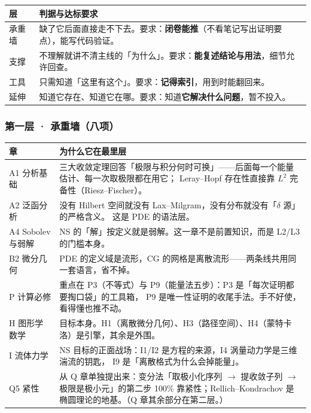 \begin{center}
\begin{tabular}{L{1.7cm}L{12.9cm}}
\toprule
\textbf{层} & \textbf{判据与达标要求} \\
\midrule
承重墙 & 缺了它后面直接走不下去。要求：\textbf{闭卷能推}（不看笔记写出证明要点），能写代码验证。 \\
支撑 & 不理解就讲不清主线的「为什么」。要求：\textbf{能复述结论与用法}，细节允许回查。 \\
工具 & 只需知道「这里有这个」。要求：\textbf{记得索引}，用到时能翻回来。 \\
延伸 & 知道它存在、知道它在哪。要求：知道\textbf{它解决什么问题}，暂不投入。 \\
\bottomrule
\end{tabular}
\end{center}

\subsubsection{第一层 · 承重墙（八项）}

\begin{center}
\begin{tabular}{L{2.5cm}L{12.0cm}}
\toprule
\textbf{章} & \textbf{为什么它在最里层} \\
\midrule
A1 分析基础 & 三大收敛定理回答「极限与积分何时可换」——后面每一个能量估计、每一次取极限都在用它；
Leray--Hopf 存在性直接靠 $L^2$ 完备性（Riesz--Fischer）。 \\
A2 泛函分析 & 没有 Hilbert 空间就没有 Lax--Milgram，没有分布就没有「$\delta$ 源」的严格含义。
这是 PDE 的语法层。 \\
A4 Sobolev 与弱解 & NS 的「解」按定义就是弱解。这一章不是前置知识，而是 L2/L3 的门槛本身。 \\
B2 微分几何 & PDE 的定义域是流形，CG 的网格是离散流形——两条线共用同一套语言，省不掉。 \\
P 计算必修 & 重点在 P3（不等式）与 P9（能量法五步）：P3 是「每次证明都要掏口袋」的工具箱，
P9 是唯一性证明的收尾手法。手不好使，看得懂也推不动。 \\
H 图形学数学 & 目标本身。H1（离散微分几何）、H3（路径空间）、H4（蒙特卡洛）是引擎，其余是外围。 \\
I 流体力学 & NS 目标的正面战场：I1/I2 是方程的来源，I4 涡量动力学是三维湍流的钥匙，
I9 是「离散格式为什么会掉能量」。 \\
Q5 紧性 & 从 Q 章单独提出来：变分法「取极小化序列 $\to$ 提收敛子列 $\to$ 极限是极小元」的第二步
100\% 靠紧性；Rellich--Kondrachov 是椭圆理论的地基。（Q 章其余部分在第二层。） \\
\bottomrule
\end{tabular}
\end{center}

